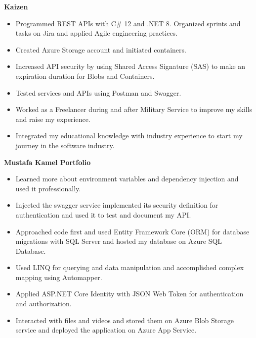 





{\bfseries Kaizen}
\begin{itemize}
    \item Programmed REST APIs with C\# 12 and .NET 8. Organized sprints and tasks on Jira and applied Agile engineering practices.
    \item Created Azure Storage account and initiated containers.
    \item Increased API security by using Shared Access Signature (SAS) to make an expiration duration for Blobs and Containers.
    \item Tested services and APIs using Postman and Swagger.
\end{itemize}

\divider

\begin{itemize}
    \item Worked as a Freelancer during and after Military Service to improve my skills and raise my experience.
    \item Integrated my educational knowledge with industry experience to start my journey in the software industry.
\end{itemize}

{\bfseries Mustafa Kamel Portfolio}\hspace{0.5cm}{\small Sep. 2022 -- Oct. 2022}
\begin{itemize}
    \item Learned more about environment variables and dependency injection and used it professionally.
    \item Injected the swagger service implemented its security definition for authentication and used it to test and document my API.
    \item Approached code first and used Entity Framework Core (ORM) for database migrations with SQL Server and hosted my database on Azure SQL Database.
    \item Used LINQ for querying and data manipulation and accomplished complex mapping using Automapper.
    \item Applied ASP.NET Core Identity with JSON Web Token for authentication and authorization.
    \item Interacted with files and videos and stored them on Azure Blob Storage service and deployed the application on Azure App Service.
\end{itemize}